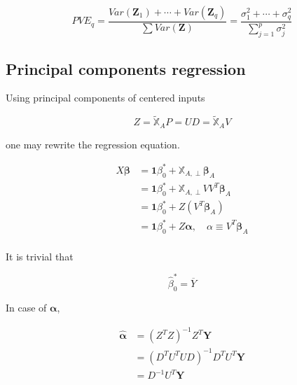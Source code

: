 \documentclass[]{book}
\theoremstyle{definition}
\theoremstyle{definition}
\theoremstyle{definition}
\theoremstyle{remark}
\begin{document}
\[PVE_q = \frac{Var(\mathbf{Z}_1) + \cdots + Var(\mathbf{Z}_q)}{\sum Var(\mathbf{Z})} = \frac{\sigma_1^2 + \cdots + \sigma_q^2}{\sum\limits_{j = 1}^p \sigma_j^2}\]

\hypertarget{principal-components-regression}{%
\subsection{Principal components regression}\label{principal-components-regression}}

Using principal components of centered inputs

\[Z = \widetilde{\mathbb{X}}_A P = UD = \widetilde{\mathbb{X}}_A V\]

one may rewrite the regression equation.

\begin{equation}
  \begin{split}
    X \boldsymbol\beta& = \mathbf{1} \beta_0^{\ast} + \mathbb{X}_{A, \perp} \boldsymbol\beta_{A} \\
    & = \mathbf{1} \beta_0^{\ast} + \mathbb{X}_{A, \perp} V V^T \boldsymbol\beta_{A} \\
    & = \mathbf{1} \beta_0^{\ast} + Z (V^T \boldsymbol\beta_{A}) \\
    & = \mathbf{1} \beta_0^{\ast} + Z \boldsymbol\alpha, \quad \alpha \equiv V^T \boldsymbol\beta_{A} \\
  \end{split}
  \label{eq:pcrmeanres}
\end{equation}

It is trivial that

\[\hat\beta_0^{\ast} = \overline{Y}\]

In case of \(\boldsymbol\alpha\),

\begin{equation}
  \begin{split}
    \hat{\boldsymbol\alpha} & = (Z^T Z)^{-1} Z^T \mathbf{Y} \\
    & = (D^TU^TUD)^{-1}D^TU^T \mathbf{Y} \\
    & = D^{-1}U^T\mathbf{Y}
  \end{split}
  \label{eq:pcralpha}
\end{equation}
\end{document}
